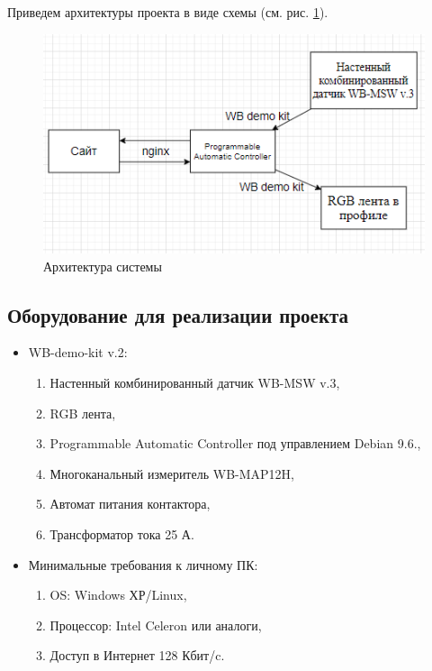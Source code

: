 \documentclass[a4paper,14pt]{extarticle}
\begin{document}
Приведем архитектуры проекта в виде схемы (см. рис. \ref{fig:architecture}).
\begin{figure}[htbp]
	\centering
	\includegraphics[width=0.5\linewidth]{images/architecture}
	\caption{Архитектура системы}
	\label{fig:architecture}
\end{figure}
\newpage
\subsection{Оборудование для реализации проекта}
\begin{itemize}
	\item WB-demo-kit v.2:
	\begin{enumerate}
		\item Настенный комбинированный датчик WB-MSW v.3,
		\item RGB лента,
		\item Programmable Automatic Controller под управлением Debian 9.6.,
		\item Многоканальный измеритель WB-MAP12H,
		\item Автомат питания контактора,
		\item Трансформатор тока 25 А.
	\end{enumerate}
	\item Минимальные требования к личному ПК:
	\begin{enumerate}
		\item OS: Windows ХР/Linux,
		\item Процессор: Intel Celeron или аналоги,
		\item Доступ в Интернет 128 Кбит/c.
	\end{enumerate}
	\fi
\end{itemize}
\end{document}
